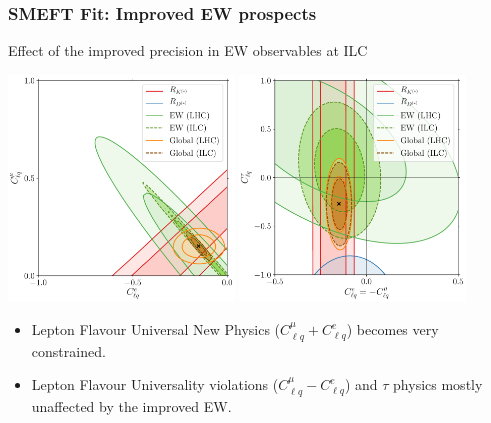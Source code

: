 \documentclass[mathserif, 10pt]{beamer}
\begin{document}
\begin{frame}\frametitle{SMEFT Fit: Improved EW prospects}

    Effect of the improved precision in EW observables at ILC
    \begin{center}
        \includegraphics[width=0.45\textwidth]{figures/scIV_ILC.pdf}
        \includegraphics[width=0.45\textwidth]{figures/scXI_ILC.pdf}
    \end{center}

\begin{itemize}
    \item Lepton Flavour Universal New Physics ($C_{\ell q}^\mu+C_{\ell q}^e$) becomes very constrained.
    \item Lepton Flavour Universality violations ($C_{\ell q}^\mu-C_{\ell q}^e$) and $\tau$ physics mostly unaffected by the improved EW.
\end{itemize}

\end{frame}
\end{document}
